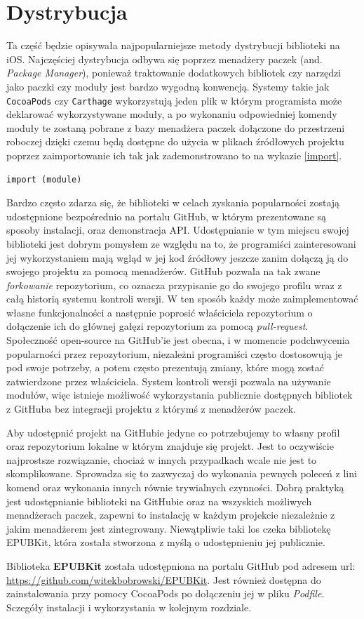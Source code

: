 \section{Dystrybucja}

Ta część będzie opisywała najpopularniejsze metody dystrybucji biblioteki na iOS. Najczęściej dystrybucja odbywa się poprzez menadżery paczek (and. \textit{Package Manager}), ponieważ traktowanie dodatkowych bibliotek czy narzędzi jako paczki czy moduły jest bardzo wygodną konwencją. Systemy takie jak \texttt{CocoaPods} czy \texttt{Carthage} wykorzystują jeden plik w którym programista może deklarować wykorzystywane moduły, a po wykonaniu odpowiedniej komendy moduły te zostaną pobrane z bazy menadżera paczek dołączone do przestrzeni roboczej dzięki czemu będą dostępne do użycia w plikach źródłowych projektu poprzez zaimportowanie ich tak jak zademonstrowano to na wykazie \ref{import}.

\begin{lstlisting}[language=swift-reference,caption={Sposób importowania dodatkowego modułu},label=import]
import (module)
\end{lstlisting}

Bardzo często zdarza się, że biblioteki w celach zyskania popularności zostają udostępnione bezpośrednio na portalu GitHub, w którym prezentowane są sposoby instalacji, oraz demonstracja API. Udostępnianie w tym miejscu swojej biblioteki jest dobrym pomysłem ze względu na to, że programiści zainteresowani jej wykorzystaniem mają wgląd w jej kod źródłowy jeszcze zanim dołączą ją do swojego projektu za pomocą menadżerów. GitHub pozwala na tak zwane \textit{forkowanie} repozytorium, co oznacza przypisanie go do swojego profilu wraz z całą historią systemu kontroli wersji. W ten sposób każdy może zaimplementować własne funkcjonalności a następnie poprosić właściciela repozytorium o dołączenie ich do głównej gałęzi repozytorium za pomocą \textit{pull-request}. Społeczność open-source na GitHub'ie jest obecna, i w momencie podchwycenia popularności przez repozytorium, niezależni programiści często dostosowują je pod swoje potrzeby, a potem często prezentują zmiany, które mogą zostać zatwierdzone przez właściciela. System kontroli wersji pozwala na używanie modułów, więc istnieje możliwość wykorzystania publicznie dostępnych bibliotek z GitHuba bez integracji projektu z którymś z menadżerów paczek.

Aby udostępnić projekt na GitHubie jedyne co potrzebujemy to własny profil oraz repozytorium lokalne w którym znajduje się projekt. Jest to oczywiście najprostsze rozwiązanie, chociaż w innych przypadkach wcale nie jest to skomplikowane. Sprowadza się to zazwyczaj do wykonania pewnych poleceń z lini komend oraz wykonania innych równie trywialnych czynności. Dobrą praktyką jest udostępnianie biblioteki na GitHubie oraz na wszyskich możliwych menadżerach paczek, zapewni to instalację w każdym projekcie niezależnie z jakim menadżerem jest zintegrowany. Niewątpliwie taki los czeka bibliotekę EPUBKit, która została stworzona z myślą o udostępnieniu jej publicznie.

Biblioteka \textbf{EPUBKit} została udostępniona na portalu GitHub pod adresem url: \url{https://github.com/witekbobrowski/EPUBKit}. Jest również dostępna do zainstalowania przy pomocy CocoaPods po dołączeniu jej w pliku \textit{Podfile}. Sczegóły instalacji i wykorzystania w kolejnym rozdziale.
